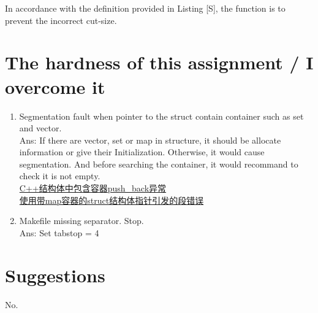 \documentclass{article}
\begin{document}
In accordance with the definition provided in Listing [S], the function is to prevent the incorrect cut-size.



\pagebreak
\section{The hardness of this assignment / I overcome it}

\begin{enumerate}
    \item Segmentation fault when pointer to the struct contain container such as set and vector.\\
    Ans: If there are vector, set or map in structure, it should be allocate information or give their Initialization. Otherwise, it would cause segmentation. And before searching the container, it would recommand to check it is not empty. \\\href{https://blog.csdn.net/little_girl_ly/article/details/80634906?spm=1001.2101.3001.6650.1&utm_medium=distribute.pc_relevant.none-task-blog-2%7Edefault%7ECTRLIST%7ERate-1-80634906-blog-39520113.235%5Ev43%5Epc_blog_bottom_relevance_base3&depth_1-utm_source=distribute.pc_relevant.none-task-blog-2%7Edefault%7ECTRLIST%7ERate-1-80634906-blog-39520113.235%5Ev43%5Epc_blog_bottom_relevance_base3&utm_relevant_index=2}{C++结构体中包含容器push\_back异常}\\\href{https://blog.csdn.net/jinking01/article/details/117082102}{使用带map容器的struct结构体指针引发的段错误}

    \item Makefile missing separator. Stop.\\
    Ans: Set tabstop = 4 
    

\end{enumerate}


\section{Suggestions}

No.
\end{document}
